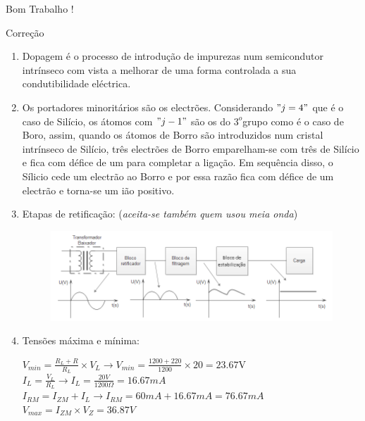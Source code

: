 \documentclass[11pt,a4paper,twoside]{report}
\begin{document}
\vspace{0.5cm}

\Huge{Bom Trabalho !}

\newpage
\normalsize
Corre\c c\~ao\\
\hrulefill

\begin{enumerate}
\item Dopagem \'e o processo de introdu\c c\~ao de impurezas num semicondutor intr\'inseco com vista a melhorar de uma forma controlada a sua condutibilidade el\'ectrica.
\item Os portadores minorit\'arios s\~ao os electr\~oes. Considerando $"j=4"$ que \'e o caso de Sil\'icio, os \'atomos com $"j-1"$ s\~ao os do $3^{o}$grupo como \'e o caso de Boro, assim, quando os \'atomos de Borro s\~ao introduzidos num cristal intr\'inseco de Sil\'icio, tr\^es electr\~oes de Borro emparelham-se com tr\^es de Sil\'icio e fica com d\'efice de um para completar a liga\c c\~ao. Em sequ\^encia disso, o S\'ilicio cede um electr\~ao ao Borro e por essa raz\~ao fica com d\'efice de um electr\~ao e torna-se um i\~ao positivo.
\item Etapas de retifica\c c\~ao: (\textit{aceita-se tamb\'em quem usou meia onda})

\begin{figure}[H]
\centering
\includegraphics[scale=0.6]{blocosretif}
\caption{}
\end{figure}

\item Tens\~oes m\'axima e m\'inima: 

$V_{min}=\frac{R_L+R}{R_L}\times V_L \longrightarrow V_{min}=\frac{1200+220}{1200}\times 20=23.67 $V\\
\vspace{0.3cm}
$I_L=\frac{V_L}{R_L}\longrightarrow I_L=\frac{20V}{1200\Omega}=16.67mA$\\
\vspace{0.3cm}
$I_{RM}=I_{ZM}+I_L \longrightarrow I_{RM}=60 mA+16.67mA=76.67mA$\\
\vspace{0.3cm}
$V_{max}=I_{ZM}\times V_Z=36.87V$\\


\end{enumerate}
\end{document}
